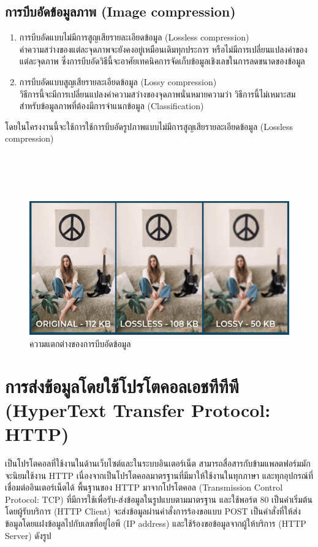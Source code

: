 \subsection{การบีบอัดข้อมูลภาพ (Image compression)}
\begin{enumerate}
  \item การบีบอัดแบบไม่มีการสูญเสียรายละเอียดข้อมูล (Lossless compression) \\
  ค่าความสว่างของแต่ละจุดภาพจะยังคงอยู่เหมือนเดิมทุกประการ หรือไม่มีการเปลี่ยนแปลงค่าของแต่ละจุดภาพ 
  ซึ่งการบีบอัดวิธีนี้จะอาศัยเทคนิคการจัดเก็บข้อมูลเชิงเลขในการลดขนาดของข้อมูล
  \item การบีบอัดแบบสูญเสียรายละเอียดข้อมูล (Lossy compression) \\
  วิธีการนี้จะมีการเปลี่ยนแปลงค่าความสว่างของจุดภาพนั่นหมายความว่า วิธีการนี้ไม่เหมาะสมสำหรับข้อมูลภาพที่ต้องมีการจำแนกข้อมูล (Classification)
\end{enumerate}
โดยในโครงงานนี้จะใช้การใช้การบีบอัดรูปภาพแบบไม่มีการสูญเสียรายละเอียดข้อมูล (Lossless compression)
\\
\\
\\
\\
\\

\begin{figure}[!ht]
  \begin{center}
    \includegraphics[scale=.7]{pic/compressiom.png}
    \caption[ความแตกต่างของการบีบอัดข้อมูล]{ความแตกต่างของการบีบอัดข้อมูล}
    \label{fig:compressiom}
  \end{center}
\end{figure}



\section{การส่งข้อมูลโดยใช้โปรโตคอลเอชทีทีพี (HyperText Transfer Protocol: HTTP) }
เป็นโปรโตคอลที่ใช้งานในด้านเว็บไซต์และในระบบอินเตอร์เน็ต สามารถสื่อสารกับข้ามแพลตฟอร์มมักจะนิยมใช้งาน HTTP 
เนื่องจากเป็นโปรโตคอลมาตรฐานที่มีมาให้ใช้งานในทุกภาษา และทุกอุปกรณ์ที่เชื่อมต่ออินเตอร์เน็ตได้ พื้นฐานของ HTTP มาจากโปรโตคอล (Transmission Control Protocol: TCP) 
ที่มีการใช้เพื่อรับ-ส่งข้อมูลในรูปแบบตามมาตรฐาน และใช้พอร์ต 80 เป็นค่าเริ่มต้น โดยผู้รับบริการ (HTTP Client) จะส่งข้อมูลผ่านคำสั่งการร้องขอแบบ POST 
เป็นคำสั่งที่ให้ส่งข้อมูลโดยแฝงข้อมูลไปกับเลขที่อยู่ไอพี (IP address) และใช้ร้องขอข้อมูลจากผู้ให้บริการ (HTTP Server) \cite{Http} ดังรูป

